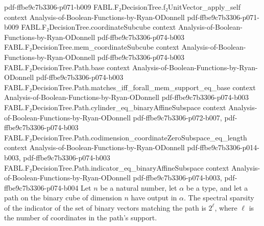 \begin{theorem}
  {pdf-ffbe9c7b3306-p071-b009}
\proofstep
  {FABL.F₂DecisionTree.f₂UnitVector_apply_self}
  {context}
  {Analysis-of-Boolean-Functions-by-Ryan-ODonnell}
  {pdf-ffbe9c7b3306-p071-b009}
\proofstep
  {FABL.F₂DecisionTree.coordinateSubcube}
  {context}
  {Analysis-of-Boolean-Functions-by-Ryan-ODonnell}
  {pdf-ffbe9c7b3306-p074-b003}
\proofstep
  {FABL.F₂DecisionTree.mem_coordinateSubcube}
  {context}
  {Analysis-of-Boolean-Functions-by-Ryan-ODonnell}
  {pdf-ffbe9c7b3306-p074-b003}
\proofstep
  {FABL.F₂DecisionTree.Path.base}
  {context}
  {Analysis-of-Boolean-Functions-by-Ryan-ODonnell}
  {pdf-ffbe9c7b3306-p074-b003}
\proofstep
  {FABL.F₂DecisionTree.Path.matches_iff_forall_mem_support_eq_base}
  {context}
  {Analysis-of-Boolean-Functions-by-Ryan-ODonnell}
  {pdf-ffbe9c7b3306-p074-b003}
\proofstep
  {FABL.F₂DecisionTree.Path.cylinder_eq_binaryAffineSubspace}
  {context}
  {Analysis-of-Boolean-Functions-by-Ryan-ODonnell}
  {pdf-ffbe9c7b3306-p072-b007,
    pdf-ffbe9c7b3306-p074-b003}
\proofstep
  {FABL.F₂DecisionTree.Path.codimension_coordinateZeroSubspace_eq_length}
  {context}
  {Analysis-of-Boolean-Functions-by-Ryan-ODonnell}
  {pdf-ffbe9c7b3306-p014-b003,
    pdf-ffbe9c7b3306-p074-b003}
\proofstep
  {FABL.F₂DecisionTree.Path.indicator_eq_binaryAffineSubspace}
  {context}
  {Analysis-of-Boolean-Functions-by-Ryan-ODonnell}
  {pdf-ffbe9c7b3306-p074-b003,
    pdf-ffbe9c7b3306-p074-b004}
Let $n$ be a natural number, let $\alpha$ be a type, and let a path on the binary cube
of dimension $n$ have output in $\alpha$. The spectral sparsity of the indicator of the
set of binary vectors matching the path is $2^\ell$, where $\ell$ is the number of
coordinates in the path's support.
\end{theorem}

